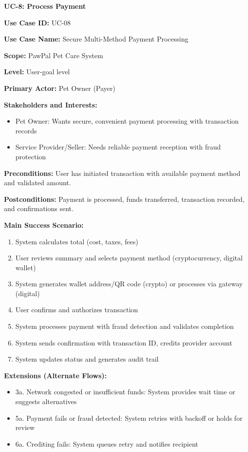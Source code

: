 \textbf{UC-8: Process Payment}

\textbf{Use Case ID:} UC-08

\textbf{Use Case Name:} Secure Multi-Method Payment Processing

\textbf{Scope:} PawPal Pet Care System

\textbf{Level:} User-goal level

\textbf{Primary Actor:} Pet Owner (Payer)

\textbf{Stakeholders and Interests:}
\begin{itemize}
    \item Pet Owner: Wants secure, convenient payment processing with transaction records
    \item Service Provider/Seller: Needs reliable payment reception with fraud protection
\end{itemize}

\textbf{Preconditions:} User has initiated transaction with available payment method and validated amount.

\textbf{Postconditions:} Payment is processed, funds transferred, transaction recorded, and confirmations sent.

\textbf{Main Success Scenario:}
\begin{enumerate}
    \item System calculates total (cost, taxes, fees)
    \item User reviews summary and selects payment method (cryptocurrency, digital wallet)
    \item System generates wallet address/QR code (crypto) or processes via gateway (digital)
    \item User confirms and authorizes transaction
    \item System processes payment with fraud detection and validates completion
    \item System sends confirmation with transaction ID, credits provider account
    \item System updates status and generates audit trail
\end{enumerate}

\textbf{Extensions (Alternate Flows):}
\begin{itemize}
    \item 3a. Network congested or insufficient funds: System provides wait time or suggests alternatives
    \item 5a. Payment fails or fraud detected: System retries with backoff or holds for review
    \item 6a. Crediting fails: System queues retry and notifies recipient
\end{itemize}

